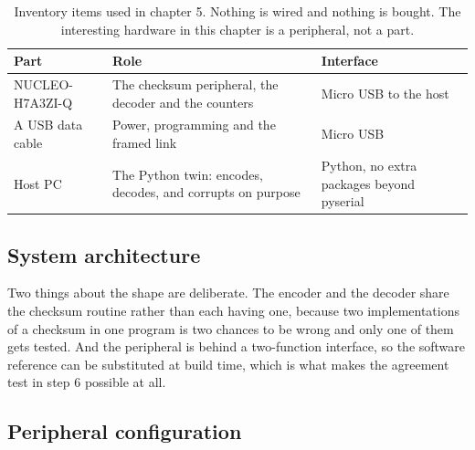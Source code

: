 \begin{table}[H]\centering\small
\begin{tabular}{p{40mm}p{66mm}p{40mm}}
\toprule
Part & Role & Interface \\
\midrule
NUCLEO-H7A3ZI-Q & The checksum peripheral, the decoder and the counters & Micro USB to the host \\
A USB data cable & Power, programming and the framed link & Micro USB \\
Host PC & The Python twin: encodes, decodes, and corrupts on purpose & Python, no extra packages beyond pyserial \\
\bottomrule
\end{tabular}
\caption{Inventory items used in chapter 5. Nothing is wired and nothing is bought. The interesting hardware in this chapter is a peripheral, not a part.}
\end{table}

\subsection*{System architecture}


Two things about the shape are deliberate. The encoder and the decoder share the
checksum routine rather than each having one, because two implementations of a
checksum in one program is two chances to be wrong and only one of them gets
tested. And the peripheral is behind a two-function interface, so the software
reference can be substituted at build time, which is what makes the agreement
test in step 6 possible at all.

\subsection*{Peripheral configuration}

